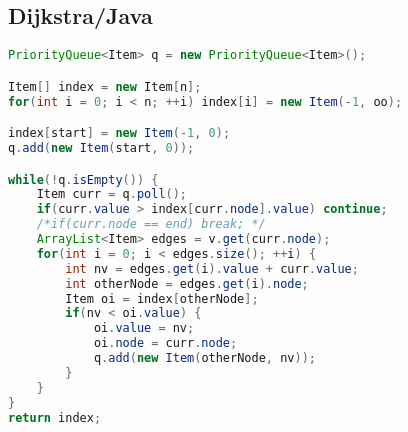 \subsection{Dijkstra/Java}
\begin{lstlisting}[language=Java]
PriorityQueue<Item> q = new PriorityQueue<Item>();

Item[] index = new Item[n];
for(int i = 0; i < n; ++i) index[i] = new Item(-1, oo);

index[start] = new Item(-1, 0);
q.add(new Item(start, 0));

while(!q.isEmpty()) {
	Item curr = q.poll();
	if(curr.value > index[curr.node].value) continue;
	/*if(curr.node == end) break; */
	ArrayList<Item> edges = v.get(curr.node);
	for(int i = 0; i < edges.size(); ++i) {
		int nv = edges.get(i).value + curr.value;
		int otherNode = edges.get(i).node;
		Item oi = index[otherNode];
		if(nv < oi.value) {
			oi.value = nv;
			oi.node = curr.node;
			q.add(new Item(otherNode, nv));
		}
	}
}
return index;
\end{lstlisting}